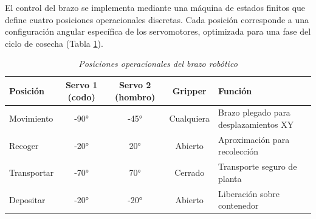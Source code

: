El control del brazo se implementa mediante una máquina de estados finitos que define cuatro posiciones operacionales discretas. Cada posición corresponde a una configuración angular específica de los servomotores, optimizada para una fase del ciclo de cosecha (Tabla \ref{tab:estados_brazo}).

\begin{table}[H]
\centering
\small
\begin{tabular}{|l|c|c|c|p{4.5cm}|}
\hline
\textbf{Posición} & \textbf{Servo 1 (codo)} & \textbf{Servo 2 (hombro)} & \textbf{Gripper} & \textbf{Función} \\
\hline
Movimiento & -90° & -45° & Cualquiera & Brazo plegado para desplazamientos XY \\
\hline
Recoger & -20° & 20° & Abierto & Aproximación para recolección \\
\hline
Transportar & -70° & 70° & Cerrado & Transporte seguro de planta \\
\hline
Depositar & -20° & -20° & Abierto & Liberación sobre contenedor \\
\hline
\end{tabular}
\caption{\textit{Posiciones operacionales del brazo robótico}}
\label{tab:estados_brazo}
\end{table}

